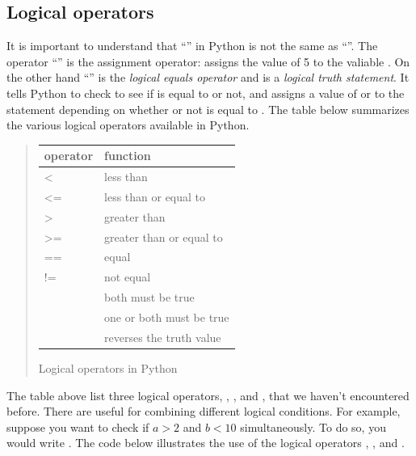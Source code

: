 \documentclass[letterpaper,10pt,english]{sphinxmanual}
\begin{document}

\subsection{Logical operators}
\label{chap6/chap6_loopsconds:logical-operators}\label{chap6/chap6_loopsconds:index-1}
It is important to understand that ``\code{==}'' in Python is not the same as ``\code{=}''.  The operator ``\code{=}'' is the assignment operator:  assigns the value of 5 to the valiable .  On the other hand ``\code{==}'' is the \emph{logical equals operator} and  is a \emph{logical truth statement}.  It tells Python to check to see if  is equal to  or not, and assigns a value of  or  to the statement  depending on whether or not  is equal to .  The table below summarizes the various logical operators available in Python.
\begin{quote}

\begin{tabulary}{\linewidth}{|L|L|}
\hline
\textbf{
operator
} & \textbf{
function
}\\\hline

\textless{}
 & 
less than
\\\hline

\textless{}=
 & 
less than or equal to
\\\hline

\textgreater{}
 & 
greater than
\\\hline

\textgreater{}=
 & 
greater than or equal to
\\\hline

==
 & 
equal
\\\hline

!=
 & 
not equal
\\\hline

 & 
both must be true
\\\hline

 & 
one or both must be true
\\\hline

 & 
reverses the truth value
\\\hline
\end{tabulary}


Logical operators in Python
\end{quote}

The table above list three logical operators, , , and , that we haven't encountered before.  There are useful for combining different logical conditions.  For example, suppose you want to check if $a>2$ and $b<10$ simultaneously.  To do so, you would write .  The code below illustrates the use of the logical operators , , and .
\end{document}
